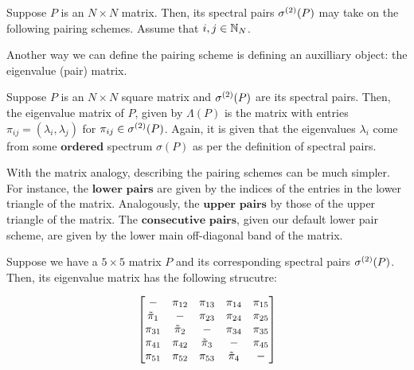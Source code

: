 \newpage
{}
Suppose $P$ is an $N \times N$ matrix. Then, its spectral pairs ${\sigma^{(2)}}(P)$ may take on the following pairing schemes. Assume that $i,j \in \mathbb{N}_N$. \newline
\begin{center}
\pairingschemetableNOIJ %
\end{center}
\vspace{1em}

\noindent Another way we can define the pairing scheme is defining an auxilliary object: the eigenvalue (pair) matrix.

\medskip
{}
\begin{definition}
Suppose $P$ is an $N \times N$ square matrix and ${\sigma^{(2)}}(P)$ are its spectral pairs.
Then, the eigenvalue matrix of $P$, given by $\Lambda(P)$ is the matrix with entries $\pi_{ij} = (\lambda_i, \lambda_j)$ for ${\pi_{ij}} \in {\sigma^{(2)}}(P)$.
Again, it is given that the eigenvalues $\lambda_i$ come from some $\textbf{ordered}$ spectrum $\sigma(P)$ as per the definition of spectral pairs.
\end{definition}

With the matrix analogy, describing the pairing schemes can be much simpler.
For instance, the $\textbf{lower pairs}$ are given by the indices of the entries in the lower triangle of the matrix.
Analogously, the $\textbf{upper pairs}$ by those of the upper triangle of the matrix.
The $\textbf{consecutive pairs}$, given our default lower pair scheme, are given by the lower main off-diagonal band of the matrix.

\begin{example}
Suppose we have a $5 \times 5$ matrix $P$ and its corresponding spectral pairs ${\sigma^{(2)}}(P)$. Then, its eigenvalue matrix has the following strucutre:
\end{example}
$$
\begin{bmatrix}
-      & \pi_{12} & \pi_{13}   & \pi_{14} & \pi_{15} \\
{\tilde{\pi}}_{1} & -      & \pi_{23}   & \pi_{24} & \pi_{25} \\
\pi_{31} & {\tilde{\pi}}_{2} & -        & \pi_{34} & \pi_{35} \\
\pi_{41} & \pi_{42} & {\tilde{\pi}}_{3} & -        & \pi_{45} \\
\pi_{51} & \pi_{52} & \pi_{53} & {\tilde{\pi}}_{4} & -        \\
\end{bmatrix}
$$
\newline

